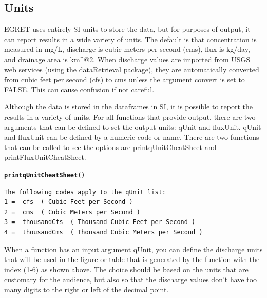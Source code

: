 \documentclass[a4paper,11pt]{article}\usepackage{graphicx, color}
\makeatletter
\newcommand{\hlfunctioncall}[1]{\textcolor[rgb]{0.501960784313725,0,0.329411764705882}{\textbf{#1}}}%
\newenvironment{kframe}{%
 \def\at@end@of@kframe{}%
 \ifinner\ifhmode%
  \def\at@end@of@kframe{\end{minipage}}%
  \begin{minipage}{\columnwidth}%
 \fi\fi%
 \def\FrameCommand##1{\hskip\@totalleftmargin \hskip-\fboxsep
 \colorbox{shadecolor}{##1}\hskip-\fboxsep
     \hskip-\linewidth \hskip-\@totalleftmargin \hskip\columnwidth}%
 \MakeFramed {\advance\hsize-\width
   \@totalleftmargin\z@ \linewidth\hsize
   \@setminipage}}%
 {\par\unskip\endMakeFramed%
 \at@end@of@kframe}
\newenvironment{knitrout}{}{} %
\makeatother
\begin{document}
\FloatBarrier
\pagebreak


\subsection{Units}
\label{sec:units}
EGRET uses entirely SI units to store the data, but for purposes of output, it can report results in a wide variety of units. The default is that concentration is measured in mg/L, discharge is cubic meters per second (cms), flux is kg/day, and drainage area is km\verb@^@2. When discharge values are imported from USGS web services (using the dataRetrieval package), they are automatically converted from cubic feet per second (cfs) to cms unless the argument convert is set to FALSE.  This can cause confusion if not careful. 

Although the data is stored in the dataframes in SI, it is possible to report the results in a variety of units. For all functions that provide output, there are two arguments that can be defined to set the output units: qUnit and fluxUnit.  qUnit and fluxUnit can be defined by a numeric code or name.  There are two functions that can be called to see the options are printqUnitCheatSheet and printFluxUnitCheatSheet.


\begin{knitrout}
\color{fgcolor}\begin{kframe}
\begin{alltt}
\hlfunctioncall{printqUnitCheatSheet}()
\end{alltt}
\begin{verbatim}
The following codes apply to the qUnit list:
1 =  cfs  ( Cubic Feet per Second )
2 =  cms  ( Cubic Meters per Second )
3 =  thousandCfs  ( Thousand Cubic Feet per Second )
4 =  thousandCms  ( Thousand Cubic Meters per Second )
\end{verbatim}
\end{kframe}
\end{knitrout}


When a function has an input argument qUnit, you can define the discharge units that will be used in the figure or table that is generated by the function with the index (1-6) as shown above. The choice should be based on the units that are customary for the audience, but also so that the discharge values don't have too many digits to the right or left of the decimal point.
\end{document}
